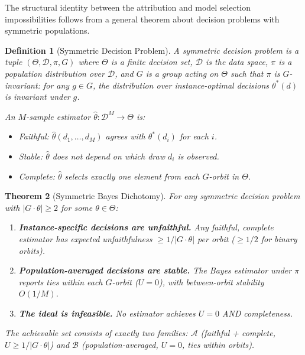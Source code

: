 \documentclass{article}
\newtheorem{theorem}{Theorem}
\newtheorem{definition}[theorem]{Definition}
\begin{document}
The structural identity between the attribution and model selection impossibilities follows from a general theorem about decision problems with symmetric populations.

\begin{definition}[Symmetric Decision Problem]
\label{def:symmetric-decision}
A \emph{symmetric decision problem} is a tuple $(\Theta, \mathcal{D}, \pi, G)$ where $\Theta$ is a finite decision set, $\mathcal{D}$ is the data space, $\pi$ is a population distribution over $\mathcal{D}$, and $G$ is a group acting on $\Theta$ such that $\pi$ is $G$-invariant: for any $g \in G$, the distribution over instance-optimal decisions $\theta^*(d)$ is invariant under $g$.

An $M$-sample estimator $\hat\theta : \mathcal{D}^M \to \Theta$ is:
\begin{itemize}
    \item \emph{Faithful}: $\hat\theta(d_1, \ldots, d_M)$ agrees with $\theta^*(d_i)$ for each $i$.
    \item \emph{Stable}: $\hat\theta$ does not depend on which draw $d_i$ is observed.
    \item \emph{Complete}: $\hat\theta$ selects exactly one element from each $G$-orbit in $\Theta$.
\end{itemize}
\end{definition}

\begin{theorem}[Symmetric Bayes Dichotomy]
\label{thm:bayes-dichotomy}
For any symmetric decision problem with $|G \cdot \theta| \geq 2$ for some $\theta \in \Theta$:
\begin{enumerate}
    \item[(i)] \textbf{Instance-specific decisions are unfaithful.} Any faithful, complete estimator has expected unfaithfulness $\geq 1/|G \cdot \theta|$ per orbit ($\geq 1/2$ for binary orbits).
    \item[(ii)] \textbf{Population-averaged decisions are stable.} The Bayes estimator under $\pi$ reports ties within each $G$-orbit ($U = 0$), with between-orbit stability $O(1/M)$.
    \item[(iii)] \textbf{The ideal is infeasible.} No estimator achieves $U = 0$ AND completeness.
\end{enumerate}
The achievable set consists of exactly two families: $\mathcal{A}$ (faithful + complete, $U \geq 1/|G \cdot \theta|$) and $\mathcal{B}$ (population-averaged, $U = 0$, ties within orbits).
\end{theorem}
\end{document}
